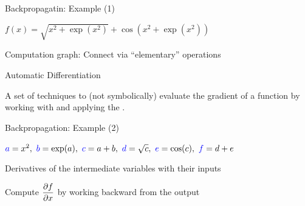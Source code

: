 \documentclass[handout,fleqn,aspectratio=169]{beamer}
\begin{document}
\begin{frame}{Backpropagatin: Example (1)}

\plitemsep 0.1in

\bci 

\item $f(x) = \sqrt{x^2 + \exp(x^2)} + \cos\left (x^2 + \exp(x^2)\right)$



\item Computation graph: Connect via ``elementary'' operations

\smallskip
{}

\item Automatic Differentiation
\bci
\item  A set of techniques to  (not symbolically) evaluate the gradient of a function by working with  and applying the . 
\eci
\eci
\end{frame}

\begin{frame}{Backpropagation: Example (2)}

\plitemsep 0.1in

\bci 

\item 
$
\bluef{a} = x^2, \ \bluef{b}=\exp(a), \ \bluef{c}=a+b, \ \bluef{d}=\sqrt{c}, \ \bluef{e}=\cos(c), \ \bluef{f} = d+e
$
\item Derivatives of the intermediate variables with their inputs
\item Compute $\displaystyle \frac{\partial f}{\partial x}$ by working backward from the output
{
\small
\vspace{-0.3cm}
}
{
\small
\vspace{-0.3cm}
}

\eci
\end{frame}
\end{document}
